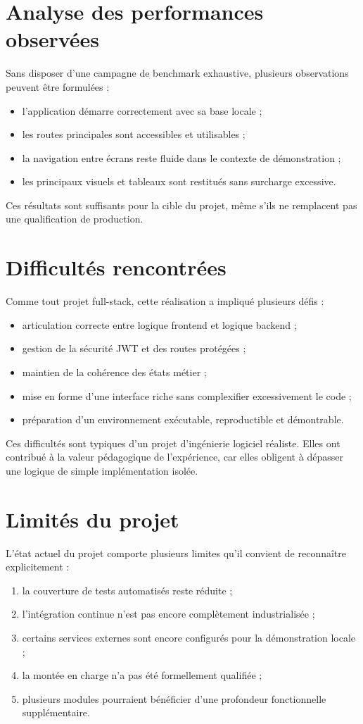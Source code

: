 ﻿\documentclass[12pt,a4paper,oneside]{report}
\begin{document}
\section{Analyse des performances observées}
Sans disposer d'une campagne de benchmark exhaustive, plusieurs observations peuvent être formulées :
\begin{itemize}
  \item l'application démarre correctement avec sa base locale ;
  \item les routes principales sont accessibles et utilisables ;
  \item la navigation entre écrans reste fluide dans le contexte de démonstration ;
  \item les principaux visuels et tableaux sont restitués sans surcharge excessive.
\end{itemize}

Ces résultats sont suffisants pour la cible du projet, même s'ils ne remplacent pas une qualification de production.

\section{Difficultés rencontrées}
Comme tout projet full-stack, cette réalisation a impliqué plusieurs défis :
\begin{itemize}
  \item articulation correcte entre logique frontend et logique backend ;
  \item gestion de la sécurité JWT et des routes protégées ;
  \item maintien de la cohérence des états métier ;
  \item mise en forme d'une interface riche sans complexifier excessivement le code ;
  \item préparation d'un environnement exécutable, reproductible et démontrable.
\end{itemize}

Ces difficultés sont typiques d'un projet d'ingénierie logiciel réaliste. Elles ont contribué à la valeur pédagogique de l'expérience, car elles obligent à dépasser une logique de simple implémentation isolée.

\section{Limités du projet}
L'état actuel du projet comporte plusieurs limites qu'il convient de reconnaître explicitement :
\begin{enumerate}
  \item la couverture de tests automatisés reste réduite ;
  \item l'intégration continue n'est pas encore complètement industrialisée ;
  \item certains services externes sont encore configurés pour la démonstration locale ;
  \item la montée en charge n'a pas été formellement qualifiée ;
  \item plusieurs modules pourraient bénéficier d'une profondeur fonctionnelle supplémentaire.
\end{enumerate}
\end{document}
